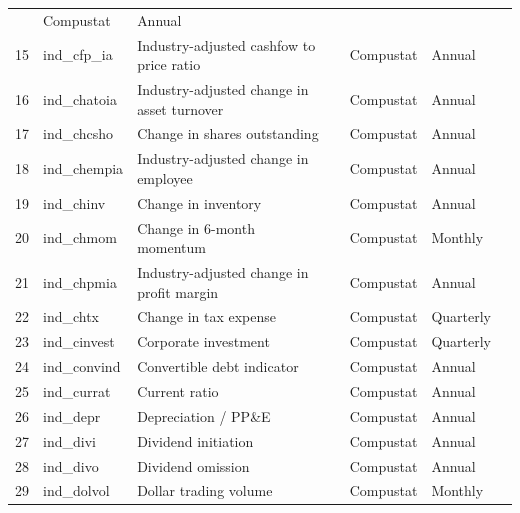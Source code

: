 \documentclass[a4paper, table]{article}
\begin{document}
\begin{landscape}
\begin{center}
\begin{longtable}{lllllll}
				\cite{desai_value-glamour_2004} & Compustat & Annual \\
			15 & ind\_cfp\_ia\footnotemark[\value{footnote}] & Industry-adjusted cashfow to price ratio & 
				\cite{asness_predicting_2000} & Compustat & Annual \\
			16 & ind\_chatoia\footnotemark[\value{footnote}] & Industry-adjusted change in asset turnover & 
				\cite{soliman_use_2008} & Compustat & Annual \\
			17 & ind\_chcsho & Change in shares outstanding & 
				\cite{pontiff_share_2008} & Compustat & Annual \\
			18 & ind\_chempia & Industry-adjusted change in employee & 
				\cite{asness_predicting_2000} & Compustat & Annual \\
			19 & ind\_chinv\footnotemark[\value{footnote}] & Change in inventory & 
				\cite{thomas_inventory_2002} & Compustat & Annual \\
			20 & ind\_chmom & Change in 6-month momentum & 
				\cite{gettleman_acceleration_2006} & Compustat & Monthly \\
			21 & ind\_chpmia\footnotemark[\value{footnote}] & Industry-adjusted change in profit margin & 
				\cite{soliman_use_2008} & Compustat & Annual \\
			22 & ind\_chtx & Change in tax expense & 
				\cite{thomas_tax_2011} & Compustat & Quarterly \\
			23 & ind\_cinvest & Corporate investment & 
				\cite{titman_capital_2004} & Compustat & Quarterly \\
			24 & ind\_convind & Convertible debt indicator & 
				\cite{valta_strategic_2016} & Compustat & Annual \\
			25 & ind\_currat & Current ratio & 
				\cite{ou_financial_1989} & Compustat & Annual \\
			26 & ind\_depr & Depreciation / PP\&E & 
				\cite{holthausen_prediction_1992} & Compustat & Annual \\
			27 & ind\_divi & Dividend initiation & 
				\cite{michaely_price_1995} & Compustat & Annual \\
			28 & ind\_divo & Dividend omission & 
				\cite{michaely_price_1995} & Compustat & Annual \\
			29 & ind\_dolvol & Dollar trading volume & 
				\cite{chordia_trading_2001} & Compustat & Monthly \\

\end{longtable}
\end{center}
\end{landscape}
\end{document}
